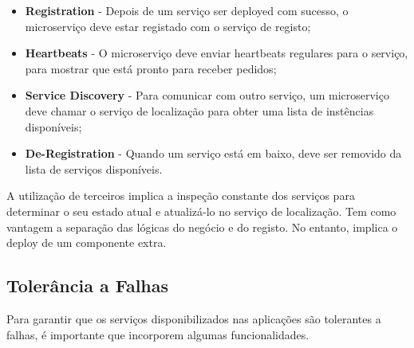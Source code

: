 \documentclass{article}
\begin{document}
\begin{itemize}
  \item \textbf{Registration} - Depois de um serviço ser deployed com sucesso,
  o microserviço deve estar registado com o serviço de registo;

  \item \textbf{Heartbeats} - O microserviço deve enviar heartbeats
  regulares para o serviço, para mostrar que está pronto para receber
  pedidos;

  \item \textbf{Service Discovery} - Para comunicar com outro
  serviço, um microserviço deve chamar o serviço de localização
  para obter uma lista de instências disponíveis;

  \item \textbf{De-Registration} - Quando um serviço está em baixo, deve ser
  removido da lista de serviços disponíveis.
\end{itemize}

A utilização de terceiros implica a inspeção constante dos serviços para determinar o seu estado atual e atualizá-lo no
serviço de localização. Tem como vantagem a separação das lógicas do negócio e do registo. No entanto, implica o
deploy de um componente extra.

\subsection{Tolerância a Falhas}

Para garantir que os serviços disponibilizados nas aplicações são tolerantes a falhas, é
importante que incorporem algumas funcionalidades.
\end{document}
